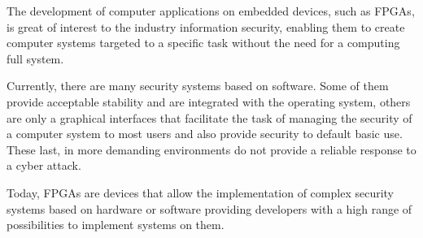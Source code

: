 
The development of computer applications on embedded devices,
such as FPGAs, is great of interest to the  industry information security,
enabling them to create computer systems targeted to a specific task 
without the need for a computing full system.

Currently, there are many security systems based on software. Some of them 
provide acceptable stability and are integrated with the operating system,
others are only a graphical interfaces that facilitate the task of
managing the security of a computer system to most users and also provide
security to default basic use. These last, in more demanding environments do not
provide a reliable response to a cyber attack.

Today, FPGAs are devices that allow the implementation of complex security
systems based on hardware or software providing developers with a high range of
possibilities to implement systems on them.